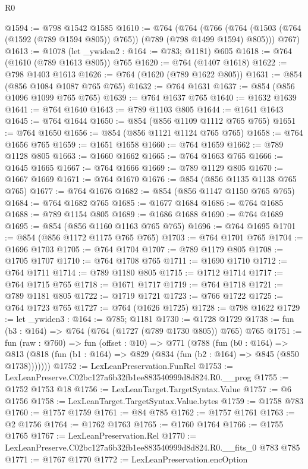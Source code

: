 \begin{lexlean}{R0}
\begin{coremodule}
@1594 := @798 @1542 @1585
@1610 := @764
    (@764
      (@766 (@764 (@1503 (@764 (@1592 (@789 @1594 @805)) @765)) (@789 (@798 @1499 @1594) @805)))
      @767)
@1613 := @1078 (let _ywiden2 : @164 := @783; @1181) @605
@1618 := @764 (@1610 (@789 @1613 @805)) @765
@1620 := @764 (@1407 @1618)
@1622 := @798 @1403 @1613
@1626 := @764 (@1620 (@789 @1622 @805))
@1631 := @854 (@856 @1084 @1087 @765 @765)
@1632 := @764 @1631
@1637 := @854 (@856 @1096 @1099 @765 @765)
@1639 := @764 @1637 @765
@1640 := @1632 @1639
@1641 := @764 @1640
@1643 := @789 @1103 @805
@1644 := @1641 @1643
@1645 := @764 @1644
@1650 := @854 (@856 @1109 @1112 @765 @765)
@1651 := @764 @1650
@1656 := @854 (@856 @1121 @1124 @765 @765)
@1658 := @764 @1656 @765
@1659 := @1651 @1658
@1660 := @764 @1659
@1662 := @789 @1128 @805
@1663 := @1660 @1662
@1665 := @764 @1663 @765
@1666 := @1645 @1665
@1667 := @764 @1666
@1669 := @789 @1129 @805
@1670 := @1667 @1669
@1671 := @764 @1670
@1676 := @854 (@856 @1135 @1138 @765 @765)
@1677 := @764 @1676
@1682 := @854 (@856 @1147 @1150 @765 @765)
@1684 := @764 @1682 @765
@1685 := @1677 @1684
@1686 := @764 @1685
@1688 := @789 @1154 @805
@1689 := @1686 @1688
@1690 := @764 @1689
@1695 := @854 (@856 @1160 @1163 @765 @765)
@1696 := @764 @1695
@1701 := @854 (@856 @1172 @1175 @765 @765)
@1703 := @764 @1701 @765
@1704 := @1696 @1703
@1705 := @764 @1704
@1707 := @789 @1179 @805
@1708 := @1705 @1707
@1710 := @764 @1708 @765
@1711 := @1690 @1710
@1712 := @764 @1711
@1714 := @789 @1180 @805
@1715 := @1712 @1714
@1717 := @764 @1715 @765
@1718 := @1671 @1717
@1719 := @764 @1718
@1721 := @789 @1181 @805
@1722 := @1719 @1721
@1723 := @766 @1722
@1725 := @764 @1723 @765
@1727 := @764 (@1626 @1725)
@1728 := @798 @1622
@1729 := let _ywiden3 : @164 := @785; @1181
@1730 := @1728 @1729
@1738 := fun (b3 : @164) => @764 (@764 (@1727 (@789 @1730 @805)) @765) @765
@1751 := fun (raw : @760) =>
  fun (offset : @10) =>
  @771
    (@788
      (fun (b0 : @164) =>
      @813 (@818 (fun (b1 : @164) => @829 (@834 (fun (b2 : @164) => @845 (@850 @1738)))))))
@1752 := LexLeanPreservation.FunRel
@1753 := LexLeanPreserve.C02bc127a6b32fb1ee883540999d8d824.R0.__prog
@1755 := @1752 @1753 @18
@1756 := LexLeanTarget.TargetSyntax.Value
@1757 := @6 @1756
@1758 := LexLeanTarget.TargetSyntax.Value.bytes
@1759 := @1758 @783
@1760 := @1757 @1759
@1761 := @84 @785
@1762 := @1757 @1761
@1763 := @2 @1756
@1764 := @1762 @1763
@1765 := @1760 @1764
@1766 := @1755 @1765
@1767 := LexLeanPreservation.Rel
@1770 := LexLeanPreserve.C02bc127a6b32fb1ee883540999d8d824.R0.__fits_0 @783 @785
@1771 := @1767 @1770
@1772 := LexLeanPreservation.encOption

\end{coremodule}
\end{lexlean}
